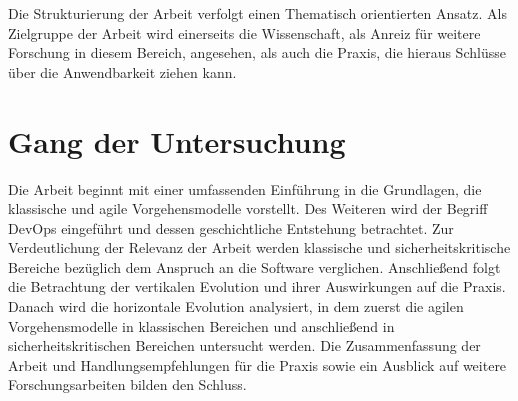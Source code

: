 Die Strukturierung der Arbeit verfolgt einen Thematisch orientierten Ansatz. 
Als Zielgruppe der Arbeit wird einerseits die Wissenschaft, als Anreiz für weitere Forschung in diesem Bereich, angesehen, als auch die Praxis, die hieraus Schlüsse über die Anwendbarkeit ziehen kann.

\section{Gang der Untersuchung}

Die Arbeit beginnt mit einer umfassenden Einführung in die Grundlagen, die klassische und agile Vorgehensmodelle vorstellt.
Des Weiteren wird der Begriff DevOps eingeführt und dessen geschichtliche Entstehung betrachtet.
Zur Verdeutlichung der Relevanz der Arbeit werden klassische und sicherheitskritische Bereiche bezüglich dem Anspruch an die Software verglichen.
Anschließend folgt die Betrachtung der vertikalen Evolution und ihrer Auswirkungen auf die Praxis.
Danach wird die horizontale Evolution analysiert, in dem zuerst die agilen Vorgehensmodelle in klassischen Bereichen und anschließend in sicherheitskritischen Bereichen untersucht werden.
Die Zusammenfassung der Arbeit und Handlungsempfehlungen für die Praxis sowie ein Ausblick auf weitere Forschungsarbeiten bilden den Schluss.



